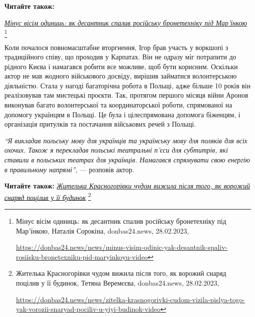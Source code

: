 \textbf{Читайте також:}\par\noindent \href{https://donbas24.news/news/minus-visim-odinic-yak-desantnik-spaliv-rosiisku-bronetexniku-pid-maryinkoyu-video}{\emph{Мінус вісім одиниць: як десантник спалив російську бронетехніку під Мар'їнкою}}%
\footnote{Мінус вісім одиниць: як десантник спалив російську бронетехніку під Мар'їнкою, Наталія Сорокіна, donbas24.news, 28.02.2023, \par%
\url{https://donbas24.news/news/minus-visim-odinic-yak-desantnik-spaliv-rosiisku-bronetexniku-pid-maryinkoyu-video}%
}


Коли почалося повномасштабне вторгнення, Ігор брав участь у воркшопі з
традиційного співу, що проходив у Карпатах. Він не одразу міг потрапити до
рідного Києва і намагався робити все можливе, щоб бути корисним. Оскільки актор
не мав жодного військового досвіду, вирішив займатися волонтерською діяльністю.
Стала у нагоді багаторічна робота в Польщі, адже більше 10 років він
реалізовував там мистецькі проєкти. Так, протягом першого місяця війни Аронов
виконував багато волонтерської та координаторської роботи, спрямованої на
допомогу українцям в Польщі. Це була і цілеспрямована допомога біженцям, і
організація притулків та постачання військових речей з Польщі.

\begin{leftbar}
\emph{\enquote{Я викладав польську мову для українців та українську мову для поляків для
всіх охочих. Також я перекладав польські театральні п'єси для субтитрів, які
ставили в польських театрах для українців. Намагався спрямувати свою енергію в
правильному напрямі}}, — розповів актор.
\end{leftbar}

\textbf{Читайте також:} \href{https://donbas24.news/news/zitelka-krasnogorivki-cudom-vizila-pislya-togo-yak-vorozii-snaryad-pociliv-u-yiyi-budinok-video}{\emph{Жителька Красногорівки чудом вижила після того, як ворожий снаряд поцілив у її будинок}}%
\footnote{Жителька Красногорівки чудом вижила після того, як ворожий снаряд поцілив у її будинок, Тетяна Веремєєва, donbas24.news, 28.02.2023, \par%
\url{https://donbas24.news/news/zitelka-krasnogorivki-cudom-vizila-pislya-togo-yak-vorozii-snaryad-pociliv-u-yiyi-budinok-video}%
}


